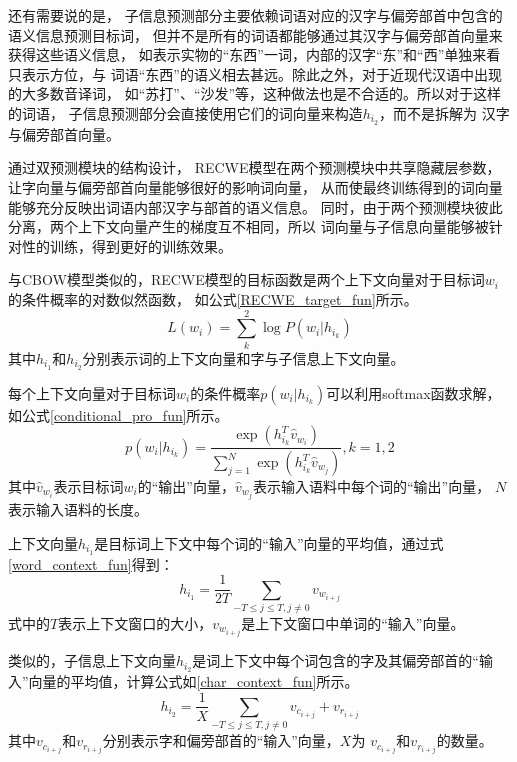 还有需要说的是，
子信息预测部分主要依赖词语对应的汉字与偏旁部首中包含的语义信息预测目标词，
但并不是所有的词语都能够通过其汉字与偏旁部首向量来获得这些语义信息，
如表示实物的“东西”一词，内部的汉字“东”和“西”单独来看只表示方位，与
词语“东西”的语义相去甚远。除此之外，对于近现代汉语中出现的大多数音译词，
如“苏打”、“沙发”等，这种做法也是不合适的。所以对于这样的词语，
子信息预测部分会直接使用它们的词向量来构造$h_{i_2}$，而不是拆解为
汉字与偏旁部首向量。

通过双预测模块的结构设计，
RECWE模型在两个预测模块中共享隐藏层参数，
让字向量与偏旁部首向量能够很好的影响词向量，
从而使最终训练得到的词向量能够充分反映出词语内部汉字与部首的语义信息。
同时，由于两个预测模块彼此分离，两个上下文向量产生的梯度互不相同，所以
词向量与子信息向量能够被针对性的训练，得到更好的训练效果。

与CBOW模型类似的，RECWE模型的目标函数是两个上下文向量对于目标词$w_i$的条件概率的对数似然函数，
如公式\ref{RECWE_target_fun}所示。
\begin{equation}
    L\left ( w_i \right )= \sum_{k}^{2}\log P\left ( w_i | h_{i_k} \right )
    \label{RECWE_target_fun}
\end{equation}
其中$h_{i_1}$和$h_{i_2}$分别表示词的上下文向量和字与子信息上下文向量。

每个上下文向量对于目标词$w_i$的条件概率$p\left( w_i|h_{i_k}\right )$可以利用softmax函数求解，
如公式\ref{conditional_pro_fun}所示。
\begin{equation}
    p\left ( w_i | h_{i_k} \right )=\frac{\exp \left ( h_{i_k}^{T}\hat{v}_{w_i} \right )}{\sum_{j=1}^{N}\exp \left ( h_{i_k}^{T}\hat{v}_{w_j} \right )},k=1,2
    \label{conditional_pro_fun}
\end{equation}
其中$\hat{v}_{w_i}$表示目标词$w_i$的“输出”向量，$\hat{v}_{w_j}$表示输入语料中每个词的“输出”向量，
$N$表示输入语料的长度。

上下文向量$h_{i_1}$是目标词上下文中每个词的“输入”向量的平均值，通过式\ref{word_context_fun}得到：
\begin{equation}
    h_{i_1}=\frac{1}{2T}\sum_{-T\leq j\leq T,j\neq 0}v_{w_{i+j}}
    \label{word_context_fun}
\end{equation}
式中的$T$表示上下文窗口的大小，$v_{w_{i+j}}$是上下文窗口中单词的“输入”向量。

类似的，子信息上下文向量$h_{i_2}$是词上下文中每个词包含的字及其偏旁部首的“输入”向量的平均值，计算公式如\ref{char_context_fun}所示。
\begin{equation}
    h_{i_2}=\frac{1}{X}\sum_{-T\leq j\leq T,j\neq 0} v_{c_{i+j}}+v_{r_{i+j}}
    \label{char_context_fun}
\end{equation}
其中$v_{c_{i+j}}$和$v_{r_{i+j}}$分别表示字和偏旁部首的“输入”向量，$X$为
$v_{c_{i+j}}$和$v_{r_{i+j}}$的数量。

